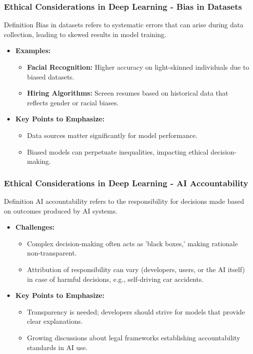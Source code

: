 \documentclass[aspectratio=169]{beamer}
\begin{document}
\begin{frame}[fragile]
  \frametitle{Ethical Considerations in Deep Learning - Bias in Datasets}
  \begin{block}{Definition}
    Bias in datasets refers to systematic errors that can arise during data collection, leading to skewed results in model training.
  \end{block}
  
  \begin{itemize}
    \item \textbf{Examples:}
    \begin{itemize}
      \item \textbf{Facial Recognition:} Higher accuracy on light-skinned individuals due to biased datasets.
      \item \textbf{Hiring Algorithms:} Screen resumes based on historical data that reflects gender or racial biases.
    \end{itemize}
    
    \item \textbf{Key Points to Emphasize:}
    \begin{itemize}
      \item Data sources matter significantly for model performance.
      \item Biased models can perpetuate inequalities, impacting ethical decision-making.
    \end{itemize}
  \end{itemize}
\end{frame}

\begin{frame}[fragile]
  \frametitle{Ethical Considerations in Deep Learning - AI Accountability}
  \begin{block}{Definition}
    AI accountability refers to the responsibility for decisions made based on outcomes produced by AI systems.
  \end{block}
  
  \begin{itemize}
    \item \textbf{Challenges:}
    \begin{itemize}
      \item Complex decision-making often acts as 'black boxes,' making rationale non-transparent.
      \item Attribution of responsibility can vary (developers, users, or the AI itself) in case of harmful decisions, e.g., self-driving car accidents.
    \end{itemize}
    
    \item \textbf{Key Points to Emphasize:}
    \begin{itemize}
      \item Transparency is needed; developers should strive for models that provide clear explanations.
      \item Growing discussions about legal frameworks establishing accountability standards in AI use.
    \end{itemize}
  \end{itemize}
\end{frame}
\end{document}
